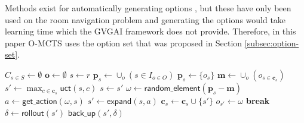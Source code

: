 Methods exist for automatically generating options \cite{castro2012automatic},
but these have only been used on the room navigation problem and generating the
options would take learning time which the GVGAI framework does not provide.
Therefore, in this paper O-MCTS uses the option set that was proposed in
Section \ref{subsec:option-set}.

\begin{algorithm}[h]
	\caption{$\mathsf{O-MCTS}(O, r, t, d)$}
	\label{alg:omcts}
	\begin{algorithmic}[1]
		\State $C_{s \in S} \gets \emptyset$ 
		\State $\mathbf{o} \gets \emptyset$ 
		 \label{alg:omcts:mainloop}
			\State $s \gets r$ 
			 \label{alg:omcts:innerloop}
				 \label{alg:omcts:sp} 
					\State $\mathbf{p}_s \gets \cup_o (s \in I_{o \in O})$ 
				\Else
					\State $\mathbf{p}_s \gets \{o_s\}$ 
				\EndIf \label{alg:omcts:ep}
				\State $\mathbf{m} \gets \cup_o (o_{s \in \mathbf{c}_s})$  \label{alg:omcts:m}
				 
					\State $s' \gets \max_{c \in \mathbf{c}_s} \mathsf{uct}(s, c)$ \label{alg:omcts:uct} 
					\State $s \gets s'$ \label{alg:omcts:ss} 
				\Else \label{alg:omcts:sexpand}
					\State $\omega \gets \mathsf{random\_element}(\mathbf{p}_s - \mathbf{m})$ 
					\State $a \gets \mathsf{get\_action}(\omega, s)$ 
					\State $s' \gets \mathsf{expand}(s, a)$ 
						\State $\mathbf{c}_s \gets \mathbf{c}_s \cup \{s'\}$ 
					\State $o_{s'} \gets \omega$
					\State \textbf{break} \label{alg:omcts:break}
				\EndIf \label{alg:omcts:eexpand}
			\EndWhile
			\State $\delta \gets \mathsf{rollout}(s')$ \label{alg:omcts:rollout}
			\State $\mathsf{back\_up}(s', \delta)$ \label{alg:omcts:backup}
		\EndWhile
		\State {}
	\end{algorithmic}
\end{algorithm}
